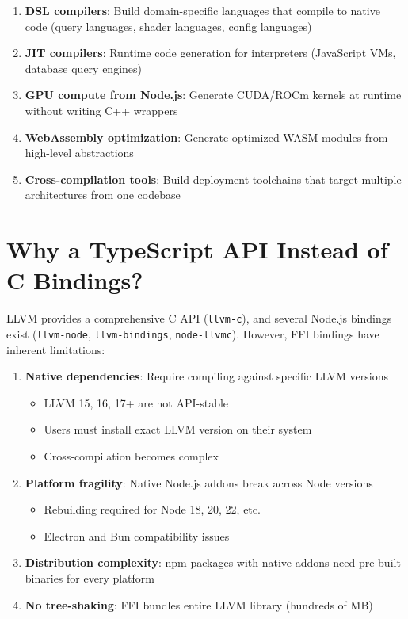 \documentclass[11pt,oneside]{book}
\begin{document}
\begin{enumerate}[noitemsep]
  \item \textbf{DSL compilers}: Build domain-specific languages that compile to native code (query languages, shader languages, config languages)
  \item \textbf{JIT compilers}: Runtime code generation for interpreters (JavaScript VMs, database query engines)
  \item \textbf{GPU compute from Node.js}: Generate CUDA/ROCm kernels at runtime without writing C++ wrappers
  \item \textbf{WebAssembly optimization}: Generate optimized WASM modules from high-level abstractions
  \item \textbf{Cross-compilation tools}: Build deployment toolchains that target multiple architectures from one codebase
\end{enumerate}

\section{Why a TypeScript API Instead of C Bindings?}

LLVM provides a comprehensive C API (\texttt{llvm-c}), and several Node.js bindings exist (\texttt{llvm-node}\cite{llvmnode}, \texttt{llvm-bindings}\cite{llvmbindings}, \texttt{node-llvmc}\cite{nodellvmc}). However, FFI bindings have inherent limitations:

\begin{enumerate}[noitemsep]
  \item \textbf{Native dependencies}: Require compiling against specific LLVM versions
  \begin{itemize}[noitemsep]
    \item LLVM 15, 16, 17+ are not API-stable
    \item Users must install exact LLVM version on their system
    \item Cross-compilation becomes complex
  \end{itemize}

  \item \textbf{Platform fragility}: Native Node.js addons break across Node versions
  \begin{itemize}[noitemsep]
    \item Rebuilding required for Node 18, 20, 22, etc.
    \item Electron and Bun compatibility issues
  \end{itemize}

  \item \textbf{Distribution complexity}: npm packages with native addons need pre-built binaries for every platform

  \item \textbf{No tree-shaking}: FFI bundles entire LLVM library (hundreds of MB)
\end{enumerate}
\end{document}
